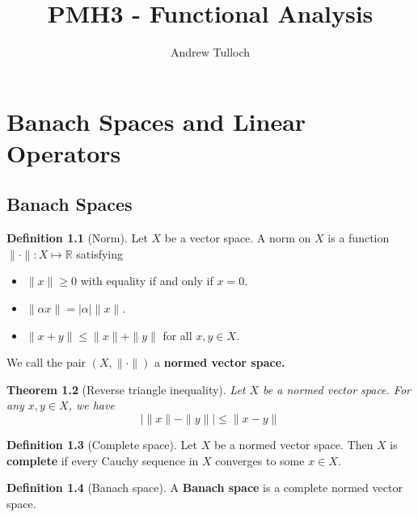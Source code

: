 \documentclass[10pt, oneside, reqno]{amsbook}
\title{PMH3 - Functional Analysis}                              %
\author{Andrew Tulloch}
\theoremstyle{plain}%
\newtheorem{thm}{Theorem}[section]
\theoremstyle{definition}
\newtheorem{defn}[thm]{Definition}
\theoremstyle{remark}
\newcommand{\R}{\mathbb{R}}
\begin{document}
\maketitle \tableofcontents \clearpage

\chapter{Banach Spaces and Linear Operators}

\section{Banach Spaces} %
\label{sec:banach_spaces}


\begin{defn}[Norm]
    Let $X$ be a vector space.  A norm on $X$ is a function $\| \cdot \| : X \mapsto \R$ satisfying 
    \begin{itemize}
        \item $\| x \| \geq 0$ with equality if and only if $x = 0$.  
        \item $\| \alpha x \| = | \alpha | \| x \|$.
        \item $\| x + y \| \leq \| x \| + \| y \|$ for all $x, y \in X$.  
    \end{itemize}
    
    We call the pair $(X, \| \cdot \|)$ a \textbf{normed vector space.}
\end{defn}

\begin{thm}[Reverse triangle inequality]
    Let $X$ be a normed vector space.  For any $x, y \in X$, we have \[
        \left| \|x \| - \| y \| \right| \leq \| x - y \|  
    \]
\end{thm}

\begin{defn}[Complete space]
    Let $X$ be a normed vector space.  Then $X$ is \textbf{complete} if every Cauchy sequence in $X$ converges to some $x \in X$.  
\end{defn}

\begin{defn}[Banach space]
    A \textbf{Banach space} is a complete normed vector space.
\end{defn}
\end{document}
